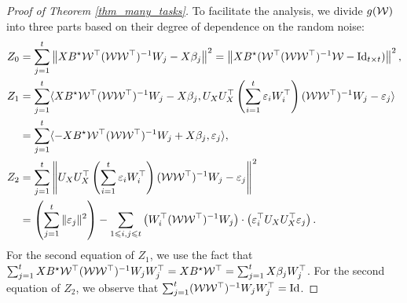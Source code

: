 \begin{proof}[Proof of Theorem \ref{thm_many_tasks}]
	To facilitate the analysis, we divide $g({\mathcal W})$ into three parts based on their degree of dependence on the random noise:
	\begin{align*}
		Z_0 &= \sum_{j=1}^t \left\| XB^{\star} {\mathcal W}^{\top} ({\mathcal W}{\mathcal W}^{\top})^{-1} W_j - X\beta_j \right\|^2 = \left\| X B^{\star} ({\mathcal W}^{\top} ({\mathcal W}{\mathcal W}^{\top})^{-1} {\mathcal W} - \operatorname{Id}_{t\times t}) \right\|^2, \\
		Z_1 &= \sum_{j=1}^t \langle XB^{\star} {\mathcal W}^{\top} ({\mathcal W}{\mathcal W}^{\top})^{-1}W_j - X\beta_j, U_X U_X^{\top} \left({\sum_{i=1}^t \varepsilon_i W_i^{\top}}\right) ({\mathcal W}{\mathcal W}^{\top})^{-1} W_j - \varepsilon_j \rangle \\
				&= \sum_{j=1}^t \langle -X B^{\star} {\mathcal W}^{\top} ({\mathcal W} {\mathcal W}^{\top})^{-1} W_j + X\beta_j, \varepsilon_j \rangle, \\
		Z_2 &= \sum_{j=1}^t \left\| U_X U_X^{\top} \left({\sum_{i=1}^t \varepsilon_i W_i^{\top}}\right) ({\mathcal W}{\mathcal W}^{\top})^{-1}W_j - \varepsilon_j \right\|^2 \\
				&= \left({\sum_{j=1}^t \|\varepsilon_j\|^2}\right) - \sum_{1\leqslant i,j\leqslant t} \left({W_i^{\top} ({\mathcal W} {\mathcal W}^{\top})^{-1} W_j}\right) \cdot \left({\varepsilon_i^{\top} U_X U_X^{\top} \varepsilon_j}\right).
	\end{align*}
	For the second equation of $Z_1$, we use the fact that $\sum_{j=1}^t X B^{\star} {\mathcal W}^{\top} ({\mathcal W}{\mathcal W}^{\top})^{-1} W_j W_j^{\top} = X B^{\star} {\mathcal W}^{\top} = \sum_{j=1}^t X \beta_j W_j^{\top}$.
	For the second equation of $Z_2$, we observe that $\sum_{j=1}^t ({\mathcal W}{\mathcal W}^{\top})^{-1} W_j W_j^{\top} = \operatorname{Id}$.


\end{proof}
